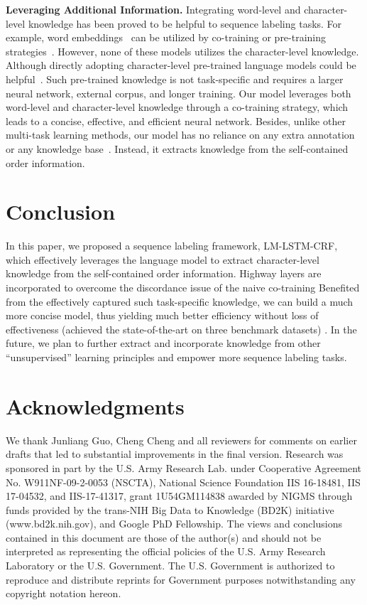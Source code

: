 \documentclass[letterpaper]{article} \usepackage{aaai18}  \usepackage{times}  \usepackage{helvet}  \usepackage{courier}  \usepackage{url}  \usepackage{graphicx}  \usepackage{multirow}
\newcommand{\our}{\textsc{LM-LSTM-CRF}\xspace}
\begin{document}
\noindent\textbf{Leveraging Additional Information.}
Integrating word-level and character-level knowledge has been proved to be helpful to sequence labeling tasks.
For example, word embeddings~\cite{mikolov2013distributed,pennington2014glove} can be utilized by co-training or pre-training strategies~\cite{2017arXiv170700166L,2016naacl}.
However, none of these models utilizes the character-level knowledge.
Although directly adopting character-level pre-trained language models could be helpful~\cite{peters2017semi}.
Such pre-trained knowledge is not task-specific and requires a larger neural network, external corpus, and longer training. 
Our model leverages both word-level and character-level knowledge through a co-training strategy, which leads to a concise, effective, and efficient neural network.
Besides, unlike other multi-task learning methods, our model has no reliance on any extra annotation~\cite{peters2017semi} or any knowledge base~\cite{shang2017automated}. 
Instead, it extracts knowledge from the self-contained order information.


\section{Conclusion}
\label{sect:con}

In this paper, we proposed a sequence labeling framework, \our, which effectively leverages the language model to extract character-level knowledge from the self-contained order information.
Highway layers are incorporated to overcome the discordance issue of the naive co-training
Benefited from the effectively captured such task-specific knowledge, we can build a much more concise model, thus yielding much better efficiency without loss of effectiveness (achieved the state-of-the-art on three benchmark datasets) . 
In the future, we plan to further extract and incorporate knowledge from other ``unsupervised'' learning principles and empower more sequence labeling tasks.


\section*{Acknowledgments}
\label{sect:ack}

We thank Junliang Guo, Cheng Cheng and all reviewers for comments on earlier drafts that led to substantial improvements in the final version.
Research was sponsored in part by the U.S. Army Research Lab. under Cooperative Agreement No. W911NF-09-2-0053 (NSCTA), National Science Foundation IIS 16-18481, IIS 17-04532, and IIS-17-41317, grant 1U54GM114838 awarded by NIGMS through funds provided by the trans-NIH Big Data to Knowledge (BD2K) initiative (www.bd2k.nih.gov), and Google PhD Fellowship. 
The views and conclusions contained in this document are those of the author(s) and should not be interpreted as representing the official policies of the U.S. Army Research Laboratory or the U.S. Government. The U.S. Government is authorized to reproduce and distribute reprints for Government purposes notwithstanding any copyright notation hereon.




\end{document}
